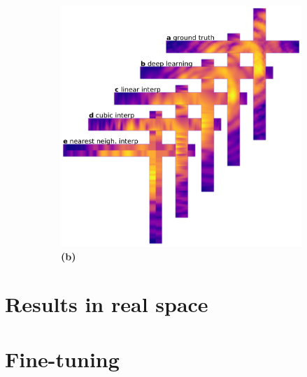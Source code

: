 \begin{figure}[h]
\begin{subfigure}{0.47\textwidth}
        \includegraphics[width=\linewidth]{figures/Inpainting/cross_interp.pdf}
        \caption{\textbf{(b)}}
    \end{subfigure}
    \caption{}
    \label{fig:interp}
\end{figure}


\section{Results in real space}\label{sec:res_real}
\section{Fine-tuning}\label{sec:finetuning}

